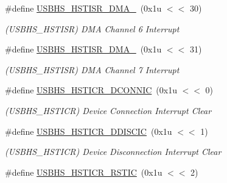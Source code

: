 \begin{DoxyCompactItemize}
\mbox{\label{group__SAMV71__USBHS_ga7b43811bc4572ab7cb7fc1399f71a7b3}} 
\#define \mbox{\hyperlink{group__SAMV71__USBHS_ga7b43811bc4572ab7cb7fc1399f71a7b3}{U\+S\+B\+H\+S\+\_\+\+H\+S\+T\+I\+S\+R\+\_\+\+D\+M\+A\+\_}}~(0x1u $<$$<$ 30)
\begin{DoxyCompactList}\small\item\em (U\+S\+B\+H\+S\+\_\+\+H\+S\+T\+I\+SR) D\+MA Channel 6 Interrupt \end{DoxyCompactList}\item 
\mbox{\label{group__SAMV71__USBHS_ga8f49c8777ee76e4e23a0ea56235cdc9a}} 
\#define \mbox{\hyperlink{group__SAMV71__USBHS_ga8f49c8777ee76e4e23a0ea56235cdc9a}{U\+S\+B\+H\+S\+\_\+\+H\+S\+T\+I\+S\+R\+\_\+\+D\+M\+A\+\_}}~(0x1u $<$$<$ 31)
\begin{DoxyCompactList}\small\item\em (U\+S\+B\+H\+S\+\_\+\+H\+S\+T\+I\+SR) D\+MA Channel 7 Interrupt \end{DoxyCompactList}\item 
\mbox{\label{group__SAMV71__USBHS_ga0fb7643d5be82c2ea2172850b38484e2}} 
\#define \mbox{\hyperlink{group__SAMV71__USBHS_ga0fb7643d5be82c2ea2172850b38484e2}{U\+S\+B\+H\+S\+\_\+\+H\+S\+T\+I\+C\+R\+\_\+\+D\+C\+O\+N\+N\+IC}}~(0x1u $<$$<$ 0)
\begin{DoxyCompactList}\small\item\em (U\+S\+B\+H\+S\+\_\+\+H\+S\+T\+I\+CR) Device Connection Interrupt Clear \end{DoxyCompactList}\item 
\mbox{\label{group__SAMV71__USBHS_ga23995ee5d7ddabec341170ca98b6d624}} 
\#define \mbox{\hyperlink{group__SAMV71__USBHS_ga23995ee5d7ddabec341170ca98b6d624}{U\+S\+B\+H\+S\+\_\+\+H\+S\+T\+I\+C\+R\+\_\+\+D\+D\+I\+S\+C\+IC}}~(0x1u $<$$<$ 1)
\begin{DoxyCompactList}\small\item\em (U\+S\+B\+H\+S\+\_\+\+H\+S\+T\+I\+CR) Device Disconnection Interrupt Clear \end{DoxyCompactList}\item 
\mbox{\label{group__SAMV71__USBHS_ga84df2c9bc871c6336be81958fe823f08}} 
\#define \mbox{\hyperlink{group__SAMV71__USBHS_ga84df2c9bc871c6336be81958fe823f08}{U\+S\+B\+H\+S\+\_\+\+H\+S\+T\+I\+C\+R\+\_\+\+R\+S\+T\+IC}}~(0x1u $<$$<$ 2)
$$
\end{DoxyCompactItemize}
